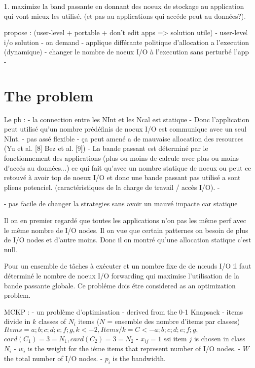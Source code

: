 \documentclass[10pt, a4paper]{article}
\begin{document}
1. maximize la band passante en donnant des noeux de stockage au application qui vont mieux les utilisé. (et pas au applications qui accéde peut au données?).

propose : (user-level + portable + don't edit apps => solution utile)
- user-level i/o solution
- on demand
- applique différante politique d'allocation a l'execution (dynamique)
- changer le nombre de noeux I/O à l'execution sans perturbé l'app
-

\section{The problem}


Le pb :
- la connection entre les NInt et les Ncal est statique
- Donc l'application peut utilisé qu'un nombre prédéfinis de noeux I/O est communique avec un seul NInt.
- pas assé flexible
- ça peut amené a de mauvaise allocation des resources (Yu et al. [8] Bez et al. [9])
- La bande passant est déterminé par le fonctionnement des applications (plus ou moins de calcule avec plus ou moins d'accés au données...) ce qui fait qu'avec un nombre statique de noeux ou peut ce retouvé à avoir top de noeux I/O et donc une bande passant pas utilisé a sont pliens potenciel. (caractéristiques de la charge de travail / accès I/O).
- 

- pas facile de changer la strategies sans avoir un mauvé impacte car statique

Il on en premier regardé que toutes les applications n'on pas les même perf avec le même nombre de I/O nodes. Il on vue que certain patternes on besoin de plus de I/O nodes et d'autre moins. Donc il on montré qu'une allocation statique c'est null.

Pour un ensemble de tâches à exécuter et un nombre fixe de de nœuds I/O il faut déterminé le nombre de noeux I/O forwarding qui maximise l'utilisation de la bande passante globale. Ce probléme dois étre considered as an optimization problem.

MCKP :
- un problème d'optimisation
- derived from the 0-1 Knapsack
- items divide in $k$ classes of $N_i$ items
($N$ = ensemble des nombre d'items par classes)
$Items = {a; b; c; d; e; f; g}, k <- 2, Items/k = C <- {{a; b; c}; {d; e; f; g}},$
$card(C_1) = 3 = N_1, card(C_2) = 3 = N_2$
- $x_{ij} = 1$ ssi item $j$ is chosen in class $N_i$
- $w_i$ is the weight for the iéme items that represent number of I/O nodes.
- $W$ the total number of I/O nodes.
- $p_i$ is the bandwidth.
\end{document}
